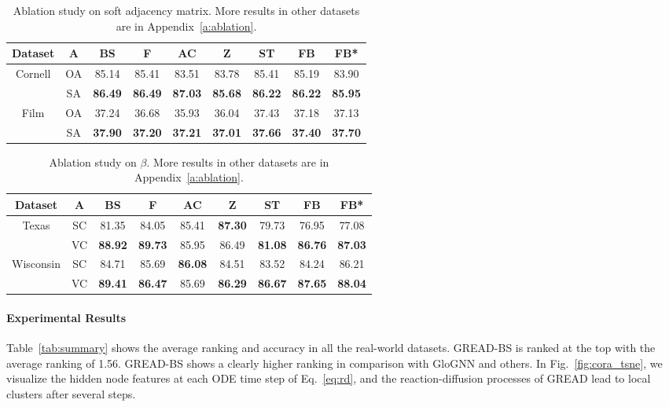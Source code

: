 \documentclass{article}
\theoremstyle{plain}
\theoremstyle{definition}
\theoremstyle{remark}
\begin{document}
\begin{table}[t]
     \small
     \centering
     \setlength{\tabcolsep}{2pt}
     \caption{Ablation study on soft adjacency matrix. More results in other datasets are in Appendix~\ref{a:ablation}.}
     \begin{tabular}{cc cccc ccc}\toprule
        Dataset & $\mathbf{A}$ &  BS & F & AC & Z & ST & FB & FB*\\ \midrule
        \multirow{2}{*}{Cornell}
        & OA   &  85.14 & 85.41 & 83.51 & 83.78 & 85.41 & 85.19 & 83.90 \\
        & SA   &  \textbf{86.49} & \textbf{86.49} & \textbf{87.03} & \textbf{85.68} & \textbf{86.22} & \textbf{86.22} & \textbf{85.95}\\
        \midrule
        \multirow{2}{*}{Film}
        & OA   &  37.24 & 36.68 & 35.93 & 36.04 & 37.43 & 37.18 & 37.13\\
        & SA   &  \textbf{37.90} & \textbf{37.20 }& \textbf{37.21} & \textbf{37.01} & \textbf{37.66} & \textbf{37.40} & \textbf{37.70}\\
        \bottomrule
     \end{tabular}
     \label{tab:soft}
 \end{table}

 \begin{table}[t]
     \small
     \centering
     \setlength{\tabcolsep}{2pt}
     \caption{Ablation study on $\beta$. More results in other datasets are in Appendix~\ref{a:ablation}.}
     \begin{tabular}{cc cccc ccc}\toprule
        Dataset & $\mathbf{A}$ &  BS & F & AC & Z & ST & FB & FB*\\ \midrule
        \multirow{2}{*}{Texas}
        & SC    &  81.35 & 84.05 & 85.41 & \textbf{87.30} & 79.73 & 76.95 & 77.08\\
        & VC    &  \textbf{88.92} & \textbf{89.73} & 85.95 & 86.49 & \textbf{81.08} & \textbf{86.76} & \textbf{87.03}\\
        \midrule
        \multirow{2}{*}{Wisconsin}
        & SC    &  84.71 & 85.69 & \textbf{86.08} & 84.51 & 83.52 & 84.24 & 86.21\\
        & VC    &  \textbf{89.41} & \textbf{86.47} & 85.69 & \textbf{86.29} & \textbf{86.67} & \textbf{87.65} & \textbf{88.04}\\
        \bottomrule
     \end{tabular}
     \label{tab:beta}
 \end{table}
 
\paragraph{Experimental Results} Table~\ref{tab:summary} shows the average ranking and accuracy in all the real-world datasets. GREAD-BS is ranked at the top with the average ranking of 1.56. GREAD-BS shows a clearly higher ranking in comparison with GloGNN and others. In Fig.~\ref{fig:cora_tsne}, we visualize the hidden node features at each ODE time step of Eq.~\eqref{eq:rd}, and the reaction-diffusion processes of GREAD lead to local clusters after several steps.
\end{document}
